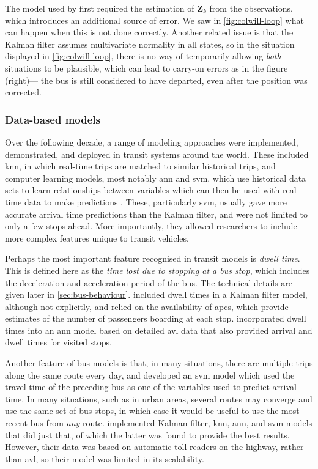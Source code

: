 \documentclass[12pt,a4paper]{article}
\newcommand{\mat}[1]{\mathbf{#1}}
\newcommand{\kf}{Kalman filter}
\begin{document}
The model used by \cite{cathey-dailey:2003} first required the
estimation of $\mat{Z}_k$ from the observations,
which introduces an additional source of error.
We saw in \cref{fig:colwill-loop} what can happen when this is not done correctly.
Another related issue is that the \kf{} assumes multivariate normality
in all states, so in the situation displayed in \cref{fig:colwill-loop},
there is no way of temporarily allowing \emph{both} situations to be plausible,
which can lead to carry-on errors as in the figure (right)---%
the bus is still considered to have departed,
even after the position was corrected.



\subsubsection{Data-based models}
\label{sec:data-models}

Over the following decade, a range of modeling approaches were implemented, demonstrated,
and deployed in transit systems around the world.
These included \gls{knn}, in which real-time trips are matched to similar historical trips,
and computer learning models, most notably \gls{ann} and \gls{svm},
which use historical data sets to learn relationships between variables
which can then be used with real-time data to make predictions
\citep{park-rilett:1999,jeong-rilett:2005,yu-etal:2006,yu-etal:2010,yu-etal:2011}.
These, particularly \gls{svm}, usually gave more accurate arrival time
predictions than the \kf{}, and were not limited to only a few stops ahead.
More importantly, they allowed researchers to include more complex features
unique to transit vehicles.


Perhaps the most important feature recognised in transit models is \emph{dwell time}.
This is defined here as the \emph{time lost due to stopping at a bus stop},
which includes the deceleration and acceleration period of the bus.
The technical details are given later in \cref{sec:bus-behaviour}.
\cite{shalaby-farhan:2004} included dwell times in a \kf{} model,
although not explicitly,
and relied on the availability of \glspl{apc},
which provide estimates of the number of passengers boarding at each stop.
\cite{jeong-rilett:2005}
incorporated dwell times into an \gls{ann} model based on detailed \gls{avl} data
that also provided arrival and dwell times for visited stops.


Another feature of bus models is that, in many situations,
there are multiple trips along the same route every day,
and \cite{yu-etal:2006} developed an \gls{svm} model which used the travel time
of the preceding bus as one of the variables used to predict arrival time.
In many situations, such as in urban areas,
several routes may converge and use the same set of bus stops,
in which case it would be useful to use the most recent bus from \emph{any} route.
\cite{yu-etal:2011} implemented \kf{}, \gls{knn}, \gls{ann}, and \gls{svm} models that did just that,
of which the latter was found to provide the best results.
However, their data was based on automatic toll readers on the highway,
rather than \gls{avl},
so their model was limited in its scalability.
\end{document}
